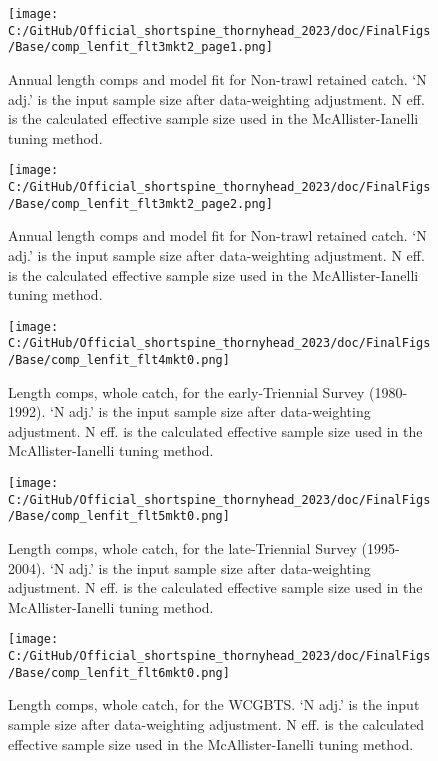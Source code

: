 \documentclass[11pt,
  letterpaper,
]{article}
\begin{document}
\begin{figure}
\centering
\texttt{[image: C:/GitHub/Official\_shortspine\_thornyhead\_2023/doc/FinalFigs/Base/comp\_lenfit\_flt3mkt2\_page1.png]}
\caption{Annual length comps and model fit for Non-trawl retained catch. `N adj.' is the input sample size after data-weighting adjustment. N eff. is the calculated effective sample size used in the McAllister-Ianelli tuning method.\label{fig:nontrawl_comps_1}}
\end{figure}

\begin{figure}
\centering
\texttt{[image: C:/GitHub/Official\_shortspine\_thornyhead\_2023/doc/FinalFigs/Base/comp\_lenfit\_flt3mkt2\_page2.png]}
\caption{Annual length comps and model fit for Non-trawl retained catch. `N adj.' is the input sample size after data-weighting adjustment. N eff. is the calculated effective sample size used in the McAllister-Ianelli tuning method.\label{fig:nontrawl_comps_2}}
\end{figure}

\begin{figure}
\centering
\texttt{[image: C:/GitHub/Official\_shortspine\_thornyhead\_2023/doc/FinalFigs/Base/comp\_lenfit\_flt4mkt0.png]}
\caption{Length comps, whole catch, for the early-Triennial Survey (1980-1992). `N adj.' is the input sample size after data-weighting adjustment. N eff. is the calculated effective sample size used in the McAllister-Ianelli tuning method.\label{fig:fits_etri}}
\end{figure}

\begin{figure}
\centering
\texttt{[image: C:/GitHub/Official\_shortspine\_thornyhead\_2023/doc/FinalFigs/Base/comp\_lenfit\_flt5mkt0.png]}
\caption{Length comps, whole catch, for the late-Triennial Survey (1995-2004). `N adj.' is the input sample size after data-weighting adjustment. N eff. is the calculated effective sample size used in the McAllister-Ianelli tuning method.\label{fig:fits_ltri}}
\end{figure}

\begin{figure}
\centering
\texttt{[image: C:/GitHub/Official\_shortspine\_thornyhead\_2023/doc/FinalFigs/Base/comp\_lenfit\_flt6mkt0.png]}
\caption{Length comps, whole catch, for the WCGBTS. `N adj.' is the input sample size after data-weighting adjustment. N eff. is the calculated effective sample size used in the McAllister-Ianelli tuning method.\label{fig:fits_wcgbts}}
\end{figure}
\end{document}
